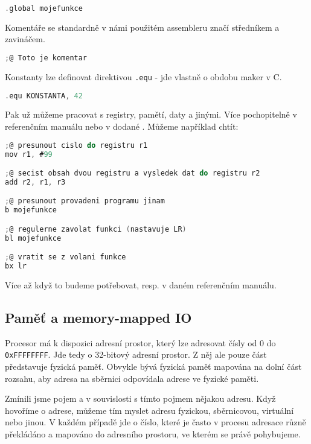 \documentclass{article}
\begin{document}
\begin{lstlisting}[language=C]
.global mojefunkce
\end{lstlisting}

Komentáře se standardně v námi použitém assembleru značí středníkem a zavináčem.

\begin{lstlisting}[language=C]
;@ Toto je komentar
\end{lstlisting}

Konstanty lze definovat direktivou \texttt{.equ} - jde vlastně o obdobu maker v C.

\begin{lstlisting}[language=C]
.equ KONSTANTA, 42
\end{lstlisting}

Pak už můžeme pracovat s registry, pamětí, daty a jinými. Více pochopitelně v referenčním manuálu nebo v dodané . Můžeme například chtít:

\begin{lstlisting}[language=C]
;@ presunout cislo do registru r1
mov r1, #99

;@ secist obsah dvou registru a vysledek dat do registru r2
add r2, r1, r3

;@ presunout provadeni programu jinam
b mojefunkce

;@ regulerne zavolat funkci (nastavuje LR)
bl mojefunkce

;@ vratit se z volani funkce
bx lr
\end{lstlisting}

Více až když to budeme potřebovat, resp. v daném referenčním manuálu.

\subsection{Paměť a memory-mapped IO}

Procesor má k dispozici adresní prostor, který lze adresovat čísly od 0 do \texttt{0xFFFFFFFF}. Jde tedy o 32-bitový adresní prostor. Z něj ale pouze část představuje fyzická paměť. Obvykle bývá fyzická paměť mapována na dolní část rozsahu, aby adresa na sběrnici odpovídala adrese ve fyzické paměti.

Zmínili jsme pojem  a v souvislosti s tímto pojmem nějakou adresu. Když hovoříme o adrese, můžeme tím myslet adresu fyzickou, sběrnicovou, virtuální nebo jinou. V každém případě jde o číslo, které je často v procesu adresace různě překládáno a mapováno do adresního prostoru, ve kterém se právě pohybujeme.
\end{document}
